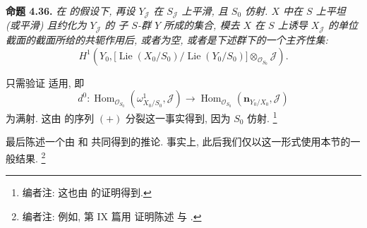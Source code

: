 
\setcounter{footnote}{132}

\medskip
\noindent{}\textbf{命题 4.36.}
\textit{在  的假设下,
再设 \(Y_{\mathscr J}\) 在 \(S_{\mathscr J}\) 上平滑, 且 \(S_0\) 仿射.
\(X\) 中在 \(S\) 上平坦 (或平滑) 且约化为 \(Y_{\mathscr J}\) 的
子 \(S\)-群 \(Y\) 所成的集合,
模去 \(X\) 在 \(S\) 上诱导 \(X_{\mathscr J}\) 的单位截面的截面所给的共轭作用后,
或者为空, 或者是下述群下的一个主齐性集:}
\[
 H^1\!\left(
 Y_0,
 \bigl[\operatorname{Lie}(X_0/S_0)/\operatorname{Lie}(Y_0/S_0)\bigr]
 \otimes_{\mathscr O_{S_0}}\mathscr J
 \right).
\]

只需验证 适用, 即
\[
 d^0:
 \operatorname{Hom}_{\mathscr O_{S_0}}
   (\omega^1_{X_0/S_0},\mathscr J)
 \longrightarrow
 \operatorname{Hom}_{\mathscr O_{S_0}}
   (\mathbf n_{Y_0/X_0},\mathscr J)
\]
为满射. 这由  的序列 \((+)\)
分裂这一事实得到, 因为 \(S_0\) 仿射.
\footnote{编者注: 这也由  的证明得到.}

最后陈述一个由  和
 共同得到的推论.
事实上, 此后我们仅以这一形式使用本节的一般结果.
\footnote{编者注: 例如, 第 IX 篇用 
证明陈述  与
.}

